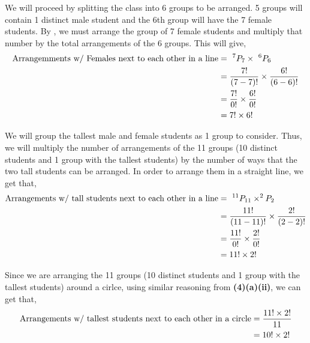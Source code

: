 \begin{subquestions}
\begin{subsubquestions}
We will proceed by splitting the class into 6 groups to be arranged. 5 groups will contain 1 distinct male student and the 6th group will have the 7 female students. By , we must arrange the group of 7 female students and multiply that number by the total arrangements of the 6 groups. This will give,
\begin{align}
	\text{Arrangemments w/ Females next to each other in a line} & = ~^7P_7 \times ~^6P_6 \nonumber \\
	                                            & = \frac{7!}{(7-7)!} \times \frac{6!}{(6-6)!} \nonumber \\
	                                            & = \frac{7!}{0!} \times \frac{6!}{0!} \nonumber \\
	                                            & = 7! \times 6! 
\end{align}


\subsubquestion

We will group the tallest male and female students as 1 group to consider. Thus, we will multiply the number of arrangements of the 11 groups (10 distinct students and 1 group with the tallest students) by the number of ways that the two tall students can be arranged. In order to arrange them in a straight line, we get that,
\begin{align}
	\text{Arrangements w/ tall students next to each other in a line} & = ~^{11}P_{11} \times ^{2}P_{2} \nonumber \\
	                                            & = \frac{11!}{(11-11)!} \times \frac{2!}{(2-2)!} \nonumber \\
	                                            & = \frac{11!}{0!} \times \frac{2!}{0!} \nonumber \\
	                                            & = 11! \times 2!
\end{align}

Since we are arranging the 11 groups (10 distinct students and 1 group with the tallest students) around a cirlce, using similar reasoning from \textbf{(4)(a)(ii)}, we can get that,
\begin{align}
	\text{Arrangements w/ tallest students next to each other in a circle} & = \frac{11! \times 2!}{11} \nonumber \\
																			 & = 10! \times 2! 
\end{align}


\end{subsubquestions}
\end{subquestions}
